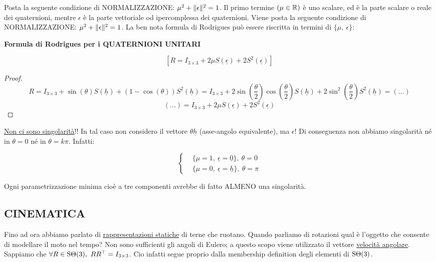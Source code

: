 Posta la seguente condizione di NORMALIZZAZIONE: $\mu^2 + \lVert\epsilon\rVert^2 = 1$.
Il primo termine $(\mu\in\mathbb{R})$ è uno scalare, ed è la parte scalare o reale dei quaternioni, mentre $\epsilon$ è la parte vettoriale od ipercomplessa dei quaternioni. Viene posta la seguente condizione di NORMALIZZAZIONE: $\mu^2 + \lVert\epsilon\rVert^2 = 1$. La ben nota formula di Rodrigues può essere riscritta in termini di $\{\mu,\ \epsilon\}$:

\begin{thrm}{\textbf{Formula di Rodrigues per i QUATERNIONI UNITARI}}

\[
	[R = I_{3\times 3} + 2\mu S(\underline{\epsilon}) + 2S^2(\underline{\epsilon})]
\]

\end{thrm}

\begin{proof}

\[
	R=I_{3\times 3} + \sin(\theta)S(\underline{h}) + (1-\cos(\theta))S^2(\underline{h}) = I_{3\times 3} + 2\sin(\frac{\theta}{2})\cos(\frac{\theta}{2})S(\underline{h}) + 2\sin^2(\frac{\theta}{2})S^2(\underline{h}) = (\dots)
\]
\[
	(\dots) = I_{3\times 3} + 2\mu S(\underline{\epsilon}) + 2S^2(\underline{\epsilon})
\]

\end{proof}

\underline{Non ci sono singolarità}!! In tal caso non considero il vettore $\theta\underline{h}$ (asse-angolo equivalente), ma $\epsilon$! Di conseguenza non abbiamo singolarità né in $\theta=0$ né in $\theta=k\pi$. Infatti:

\[
	\left\{
	\begin{aligned}
	&\{\mu=1,\ \underline{\epsilon}=\underline{0}\},\ \theta=0\\
	&\{\mu=0,\ \underline{\epsilon}=\underline{h}\},\ \theta=\pi
	\end{aligned} 
	\right.
\]

Ogni parametrizzazione minima cioè a tre componenti avrebbe di fatto ALMENO una singolarità.

\subsection{CINEMATICA}

Fino ad ora abbiamo parlato di \underline{rappresentazioni statiche} di terne che ruotano. Quando parliamo di rotazioni qual è l'oggetto che consente di modellare il moto nel tempo? Non sono sufficienti gli angoli di Eulero; a questo scopo viene utilizzato il vettore \underline{velocità angolare}. Sappiamo che $\forall R\in\operatorname{S\Theta}(3),\ RR^\top = I_{3\times 3}$. Cio infatti segue proprio dalla membership definition degli elementi di $\operatorname{S\Theta}(3)$.

